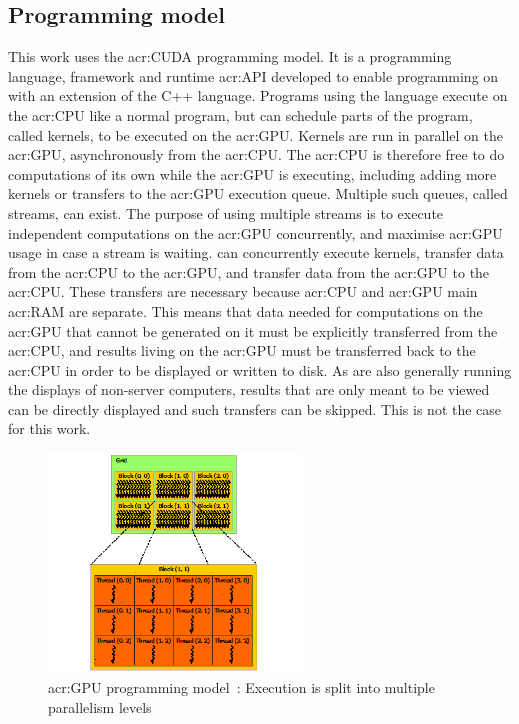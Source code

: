\subsection{Programming model}\label{subsection:graphics_processing_units:architecture:programming_model}

This work uses the \acrshort{acr:CUDA} programming model. It is a programming language, framework
and runtime \acrfull{acr:API} developed to enable programming on  with an
extension of the C++ language. Programs using the language execute on the \acrshort{acr:CPU} like a
normal program, but can schedule parts of the program, called kernels, to be executed on the
\acrshort{acr:GPU}. Kernels are run in parallel on the \acrshort{acr:GPU}, asynchronously from the
\acrshort{acr:CPU}. The \acrshort{acr:CPU} is therefore free to do computations of its own while the
\acrshort{acr:GPU} is executing, including adding more kernels or transfers to the
\acrshort{acr:GPU} execution queue. Multiple such queues, called streams, can exist. The purpose of
using multiple streams is to execute independent computations on the \acrshort{acr:GPU}
concurrently, and maximise \acrshort{acr:GPU} usage in case a stream is waiting.
 can concurrently execute kernels, transfer data from the \acrshort{acr:CPU} to
the \acrshort{acr:GPU}, and transfer data from the \acrshort{acr:GPU} to the \acrshort{acr:CPU}.
These transfers are necessary because \acrshort{acr:CPU} and \acrshort{acr:GPU} main
\acrlong{acr:RAM} are separate. This means that data needed for computations on the
\acrshort{acr:GPU} that cannot be generated on it must be explicitly transferred from the
\acrshort{acr:CPU}, and results living on the \acrshort{acr:GPU} must be transferred back to the
\acrshort{acr:CPU} in order to be displayed or written to disk. As  are also
generally running the displays of non-server computers, results that are only meant to be viewed can
be directly displayed and such transfers can be skipped. This is not the case for this work. 

\begin{figure}[H]
    \centering
    \includegraphics[width=0.6\textwidth]{Chapter_graphics_processing_units/media/grid-of-thread-blocks}
    \caption{\Acrshort{acr:GPU} programming model~\cite{Nvidia2021}: Execution is split into multiple parallelism levels}\label{fig:gpu_programming_model}
\end{figure}

